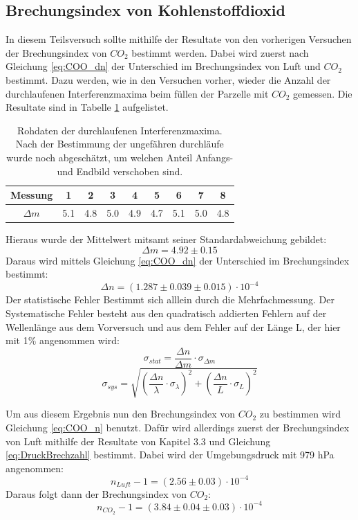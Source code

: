 \documentclass[12pt,a4paper]{article}
\begin{document}
\subsection{Brechungsindex von Kohlenstoffdioxid}
In diesem Teilsversuch sollte mithilfe der Resultate von den vorherigen Versuchen der Brechungsindex von $CO_2$ bestimmt werden. Dabei wird zuerst nach Gleichung \ref{eq:COO_dn} der Unterschied im Brechungsindex von Luft und $CO_2$ bestimmt. Dazu werden, wie in den Versuchen vorher, wieder die Anzahl der durchlaufenen Interferenzmaxima beim füllen der Parzelle mit $CO_2$ gemessen. Die Resultate sind in Tabelle \ref{tab:COO_Rohdaten} aufgelistet.

\begin{table}
\center
\begin{tabular}{|c|c|c|c|c|c|c|c|c|}
\hline
Messung & 1 & 2 & 3 & 4 & 5 & 6 & 7 & 8\\
\hline
$\Delta m$ & 5.1 & 4.8 & 5.0 & 4.9 & 4.7 & 5.1 & 5.0 & 4.8\\
\hline
\end{tabular}
\caption{Rohdaten der durchlaufenen Interferenzmaxima. Nach der Bestimmung der ungefähren durchläufe wurde noch abgeschätzt, um welchen Anteil Anfangs- und Endbild verschoben sind.}
\label{tab:COO_Rohdaten}
\end{table}

Hieraus wurde der Mittelwert mitsamt seiner Standardabweichung gebildet:
\begin{equation}
\Delta m = 4.92 \pm 0.15
\end{equation}
Daraus wird mittels Gleichung \ref{eq:COO_dn} der Unterschied im Brechungsindex bestimmt:
\begin{equation}
\Delta n = (1.287 \pm 0.039 \pm 0.015)\cdot 10^{-4}
\end{equation}
Der statistische Fehler Bestimmt sich alllein durch die Mehrfachmessung.
Der Systematische Fehler besteht aus den quadratisch addierten Fehlern auf der Wellenlänge aus dem Vorversuch und aus dem Fehler auf der Länge L, der hier mit 1\% angenommen wird:
\begin{equation}
\sigma_{stat} = \dfrac{\Delta n}{\Delta m} \cdot \sigma_{\Delta m}
\end{equation}
\begin{equation}
\sigma_{sys} = \sqrt{\left(\dfrac{\Delta n}{\lambda} \cdot \sigma_{\lambda}\right)^2 + \left(\dfrac{\Delta n}{L} \cdot \sigma_{L}\right)^2}
\end{equation}

Um aus diesem Ergebnis nun den Brechungsindex von $CO_2$ zu bestimmen wird Gleichung \ref{eq:COO_n} benutzt. Dafür wird allerdings zuerst der Brechungsindex von Luft mithilfe der Resultate von Kapitel 3.3 und Gleichung \ref{eq:DruckBrechzahl} bestimmt. Dabei wird der Umgebungsdruck mit 979 hPa angenommen:
\begin{equation}
n_{Luft}-1 = (2.56 \pm 0.03)\cdot 10^{-4}
\end{equation}
Daraus folgt dann der Brechungsindex von $CO_2$:
\begin{equation}
n_{CO_2}-1 = (3.84 \pm 0.04 \pm 0.03)\cdot 10^{-4}
\end{equation}
\end{document}
